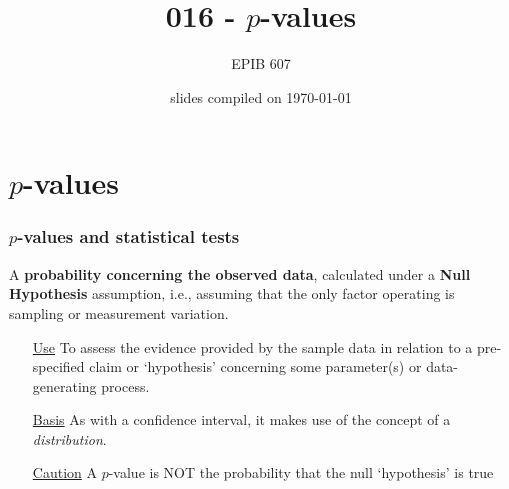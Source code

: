 \documentclass[10pt]{beamer}\usepackage[]{graphicx}\usepackage[]{color}
\begin{document}
	
	
	


\title{016 - $p$-values}
\author{EPIB 607}

\date{slides compiled on \today}

\maketitle

\section{$p$-values}
\begin{frame}
	\frametitle{$p$-values and statistical tests}
	
	
	\begin{definition}[$p$-value]
		A \textbf{probability concerning the observed data}, calculated under a \textbf{Null Hypothesis} assumption, i.e., assuming that the only factor operating is sampling or measurement variation. 
	\end{definition}
	
	\begin{itemize} 
		\item[\underline{Use}] To assess the evidence provided by the sample data
		in relation to a pre-specified claim or `hypothesis' concerning some parameter(s) or data-generating process. 
		\item[\underline{Basis}] As with a confidence interval, it makes use of the concept of a \textit{distribution}. 
		\item[\underline{Caution}] A $p$-value is NOT the probability that the null `hypothesis' is true
	\end{itemize}
\end{frame}
\end{document}
